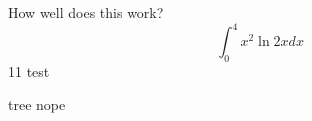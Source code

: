 \documentclass{article}
\begin{document}
How well does this work?
$$\int_0^4 x^2 \ln{2x}dx$$
11  test

tree nope
\end{document}
